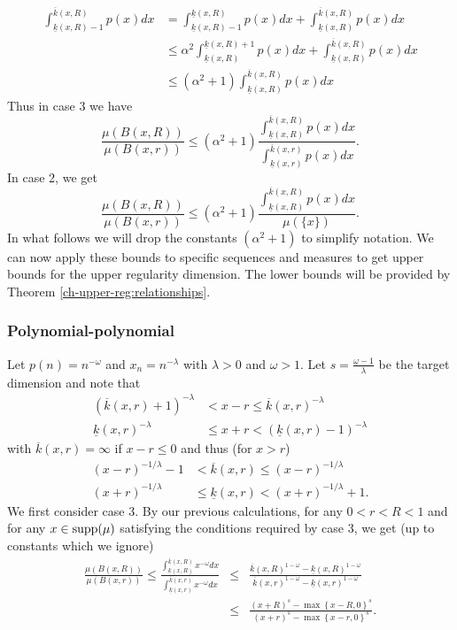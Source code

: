 \begin{align*}
\int_{\underline{k}(x,R)-1}^{\overline{k}(x,R)} p(x)dx &=\int_{\underline{k}(x,R)-1}^{\underline{k}(x,R)} p(x)dx + \int_{\underline{k}(x,R)}^{\overline{k}(x,R)} p(x)dx \\
&\le \alpha^2\int_{\underline{k}(x,R)}^{\underline{k}(x,R)+1} p(x)dx + \int_{\underline{k}(x,R)}^{\overline{k}(x,R)} p(x)dx \\
&\le (\alpha^2+1) \int_{\underline{k}(x,R)}^{\overline{k}(x,R)} p(x)dx 
\end{align*}
Thus in case 3 we have 
\[
\frac{\mu(B(x,R))}{\mu(B(x,r))} \le (\alpha^2+1) \frac{\int_{\underline{k}(x,R)}^{\overline{k}(x,R)} p(x)dx}{\int_{\underline{k}(x,r)}^{\overline{k}(x,r)} p(x)dx}.
\]
In case 2, we get 
\[
\frac{\mu(B(x,R))}{\mu(B(x,r))} \le (\alpha^2+1)  \frac{\int_{\underline{k}(x,R)}^{\overline{k}(x,R)} p(x)dx}{\mu(\{x\})}.
\]
In what follows we will drop the constants $(\alpha^2+1) $ to simplify notation.  We can now apply these bounds to specific sequences and measures to get upper bounds for the upper regularity dimension.  The lower bounds will be provided by Theorem \ref{ch-upper-reg:relationships}.

\subsubsection{Polynomial-polynomial}

Let $p(n)=n^{-\omega}$ and $x_n=n^{-\lambda}$ with $\lambda>0$ and $\omega>1$.  Let $s=\frac{\omega-1}{\lambda}$ be the target dimension and note that
\begin{align*}
(\overline{k}(x,r)+1)^{-\lambda}&<x-r\le \overline{k}(x,r)^{-\lambda} \\
\underline{k}(x,r)^{-\lambda}&\le x+r< (\underline{k}(x,r)-1)^{-\lambda} 
\end{align*}
with $\overline{k}(x,r) = \infty$ if $x-r\le 0$ and thus (for $x > r$)
\begin{align*}
(x-r)^{-1/\lambda}-1 &< \overline{k}(x,r) \le (x-r)^{-1/\lambda} \\
(x+r)^{-1/\lambda} &\le \underline{k}(x,r) < (x+r)^{-1/\lambda}+1.
\end{align*}
We first consider case 3. By our previous calculations, for any $0<r<R<1$ and for any $x\in \textup{supp}(\mu)$ satisfying the conditions required by case 3, we get (up to constants which we ignore)
\begin{eqnarray*}
	\frac{\mu(B(x,R))}{\mu(B(x,r))} \le \frac{\int_{\underline{k}(x,R)}^{\overline{k}(x,R)} x^{-\omega}dx}{\int_{\underline{k}(x,r)}^{\overline{k}(x,r)} x^{-\omega}dx} &\le& \frac{\overline{k}(x,R)^{1-\omega}-\underline{k}(x,R)^{1-\omega}}{\overline{k}(x,r)^{1-\omega}-\underline{k}(x,r)^{1-\omega}} \\ 
	& \le & \frac{(x+R)^{s}-\max\left\{ x-R,0\right\}^{s}}{(x+r)^{s}-\max\left\{x-r,0\right\}^s}.
\end{eqnarray*}



